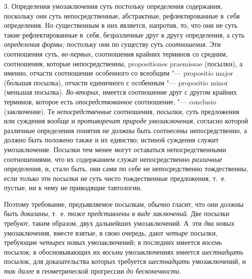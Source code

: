 3. Определения умозаключения суть постольку определения
содержания, поскольку они суть непосредственные, абстрактные,
рефлектированные в~себя определения. Но существенным в них является,
напротив, то, что они не суть такие рефлектированные в~себя, безразличные
друг к другу определения, а суть
{\em определения формы;}
постольку они по существу суть
{\em соотношения}. Эти
соотношения суть, {\em во-первых},
соотношения крайних терминов со средним, соотношения, которые
непосредственны, proposi\-tiones prae\-missae (посылки), а
именно, отчасти соотношение особенного со всеобщим "--- propositio major
(б\'{о}льшая посылка), отчасти единичного с особенным "---
propositio minor (меньшая посылка).
{\em Во-вторых}, имеется
соотношение друг с другом крайних терминов, которое есть
{\em опосредствованное}
соотношение, "--- conclusio (заключение). Те
{\em непосредственные}
соотношения, посылки, суть предложения или суждения вообще и
{\em противоречат природе
умозаключения}, согласно которой различные определения
понятия не должны быть соотнесены непосредственно, а должно быть положено
также и их единство; истиной суждения служит умозаключение. Посылки тем
менее могут оставаться непосредственными соотношениями, что их содержанием
служат непосредственно {\em различные}
определения, и, стало быть, они сами по себе не
непосредственно тождественны, если только эти посылки не суть чисто
тождественные предложения, т.~е. пустые, ни к чему не приводящие
тавтологии.

Поэтому требование, предъявляемое посылкам, обычно гласит, что
они должны быть {\em доказаны},
т.~е. {\em тоже
представлены в виде заключений}. Две посылки требуют, таким
образом, двух дальнейших умозаключений. А~эти
{\em два} новых
умозаключения, вместе взятые, в свою очередь, дают
{\em четыре} посылки,
требующие {\em четырех}
новых умозаключений; в последних имеется
{\em восемь} посылок; в
обосновывающих их {\em восьми}
умозаключениях имеется
{\em шестнадцать}
посылок, для доказательства которых требуется
{\em шестнадцать}
умозаключений, и {\em так
далее} в геометрической прогрессии
{\em до бесконечности}.

